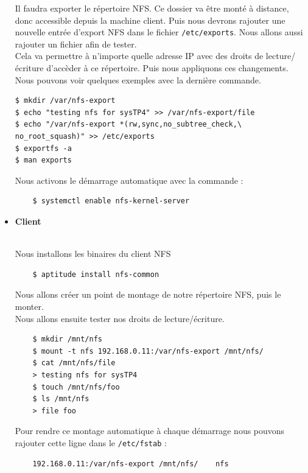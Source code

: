 \documentclass{report}
\begin{document}
\begin{itemize}
Il faudra exporter le répertoire NFS. Ce dossier va être monté à distance, donc accessible
depuis la machine client. Puis nous devrons rajouter une nouvelle entrée d'export NFS
dans le fichier \texttt{/etc/exports}. Nous allons aussi rajouter un fichier afin de tester.\\
Cela va permettre à n'importe quelle adresse IP avec des droits de lecture/écriture d'accèder
à ce répertoire. Puis nous appliquons ces changements.
Nous pouvons voir quelques exemples avec la dernière commande.
\begin{tcolorbox}
  \begin{verbatim}
$ mkdir /var/nfs-export
$ echo "testing nfs for sysTP4" >> /var/nfs-export/file
$ echo "/var/nfs-export *(rw,sync,no_subtree_check,\
no_root_squash)" >> /etc/exports
$ exportfs -a
$ man exports
  \end{verbatim}
\end{tcolorbox}
Nous activons le démarrage automatique avec la commande :
\begin{tcolorbox}
  \begin{verbatim}
    $ systemctl enable nfs-kernel-server
  \end{verbatim}
\end{tcolorbox}
  \item \begin{LARGE}{\textbf{Client}} \end{LARGE}
  \vspace{0.3cm}\\
Nous installons les binaires du client NFS
\begin{tcolorbox}
  \begin{verbatim}
    $ aptitude install nfs-common
  \end{verbatim}
\end{tcolorbox}
Nous allons créer un point de montage de notre répertoire NFS, puis le monter.\\
Nous allons ensuite tester nos droits de lecture/écriture.
\begin{tcolorbox}
  \begin{verbatim}
    $ mkdir /mnt/nfs
    $ mount -t nfs 192.168.0.11:/var/nfs-export /mnt/nfs/
    $ cat /mnt/nfs/file
    > testing nfs for sysTP4
    $ touch /mnt/nfs/foo
    $ ls /mnt/nfs
    > file foo
  \end{verbatim}
\end{tcolorbox}
Pour rendre ce montage automatique à chaque démarrage nous pouvons rajouter
cette ligne dans le \texttt{/etc/fstab} :
\begin{tcolorbox}
  \begin{verbatim}
    192.168.0.11:/var/nfs-export /mnt/nfs/    nfs
  \end{verbatim}
\end{tcolorbox}
\end{itemize}
\end{document}

